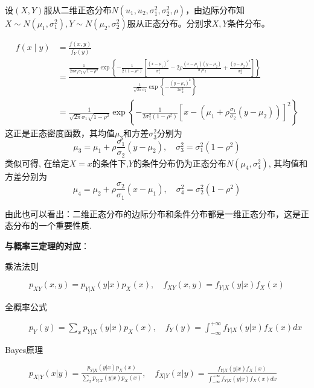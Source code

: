 \begin{example}\label{exam:3.5.4}
    设$(X,Y)$服从二维正态分布$N(u_1,u_2,\sigma_1^2,\sigma_2^2,\rho)$，由边际分布知$X \sim N(\mu_1,\sigma_1^2), Y \sim N(\mu_2,\sigma_2^2)$服从正态分布。分别求$X,Y$条件分布。
\end{example}
\begin{solution}
    \begin{align*}
        f(x \mid y) & =\frac{f(x, y)}{f_Y(y)}                                                                                                                                                                                                                                                                                            \\
                    & =\frac{\frac1{2 \pi \sigma_1 \sigma_2 \sqrt{1-\rho^2}} \exp \left\{-\frac1{2(1-\rho^2)}\left[\frac{(x-\mu_1)^2}{\sigma_1^2}-2 \rho \frac{(x-\mu_1)(y-\mu_2)}{\sigma_1 \sigma_2}+\frac{(y-\mu_2)^2}{\sigma_2^2}\right]\right\}}{\frac1{\sqrt{2 \pi} \sigma_2}\exp \left\{-\frac{(y-\mu_2)^2}{2 \sigma_2^2}\right\}} \\
                    & =\frac1{\sqrt{2 \pi} \sigma_1 \sqrt{1-\rho^2}} \exp \left\{-\frac1{2 \sigma_1^2(1-\rho^2)}\left[x-\left(\mu_1+\rho \frac{\sigma_1}{\sigma_2}(y-\mu_2)\right)\right]^2\right\}
    \end{align*}
    这正是正态密度函数，其均值$\mu_3$和方差$\sigma_3^2$分别为
    \[ \mu_{3}=\mu_{1}+\rho \frac{\sigma_{1}}{\sigma_{2}}\left(y-\mu_{2}\right),\quad \sigma_{3}^{2}=\sigma_{1}^{2}\left(1-\rho^{2}\right) \]
    类似可得, 在给定$X=x$的条件下,$Y$的条件分布仍为正态分布$N(\mu_4,\sigma_4^2)$, 其均值和方差分别为
    \[ \mu_{4}=\mu_{2}+\rho \frac{\sigma_{2}}{\sigma_{1}}\left(x-\mu_{1}\right),\quad \sigma_{4}^{2}=\sigma_{2}^{2}\left(1-\rho^{2}\right) \]
\end{solution}
由此也可以看出：二维正态分布的边际分布和条件分布都是一维正态分布，这是正态分布的一个重要性质.

\textbf{与概率三定理的对应}：
\begin{description}
    \item[乘法法则] $p_{XY}(x,y)=p_{Y|X}(y|x)p_{X}(x), \quad f_{XY}(x,y)=f_{Y|X}(y|x)f_{X}(x)$
    \item[全概率公式] $p_Y(y)=\sum_{x}p_{Y|X}(y|x)p_{X}(x), \quad f_Y(y)=\int^{+\infty}_{-\infty}f_{Y|X}(y|x)f_{X}(x)dx$
    \item[Bayes原理] $p_{X|Y}(x|y)=\frac{p_{Y|X}(y|x)p_{X}(x)}{\sum_{x}p_{Y|X}(y|x)p_{X}(x)}, \quad f_{X|Y}(x|y)=\frac{f_{Y|X}(y|x)f_{X}(x)}{\int^{+\infty}_{-\infty}f_{Y|X}(y|x)f_{X}(x)dx}$
\end{description}

